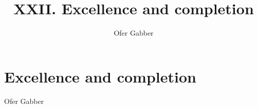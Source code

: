 \documentclass[10pt]{../fichiers-configuration-latex/smfart}
\author{Ofer Gabber}
\title{XXII. Excellence and completion}
\begin{document}
\maketitle
\tableofcontents
\else
{}
\chapter{Excellence and completion}
\begin{center}
Ofer Gabber
\end{center}
\fi
\ifx\danslelivre\undefined


\end{document}
